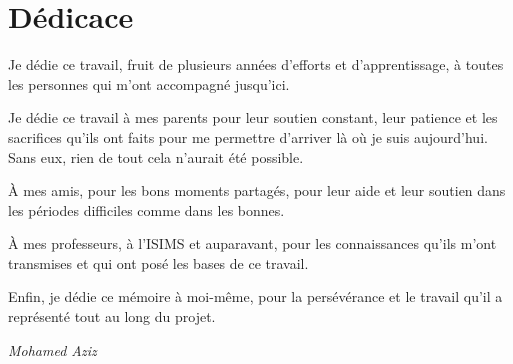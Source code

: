 \thispagestyle{empty}
\chapter*{Dédicace}

\vspace{2cm}

\begin{center}
\begin{minipage}{0.8\textwidth}
\setlength{\parskip}{10pt}

Je dédie ce travail, fruit de plusieurs années d'efforts et d'apprentissage, à toutes les personnes
qui m'ont accompagné jusqu'ici.

Je dédie ce travail à mes parents pour leur soutien constant, leur patience et les sacrifices
qu'ils ont faits pour me permettre d'arriver là où je suis aujourd'hui. Sans eux, rien de tout cela
n'aurait été possible.

À mes amis, pour les bons moments partagés, pour leur aide et leur soutien dans les périodes
difficiles comme dans les bonnes.

À mes professeurs, à l'ISIMS et auparavant, pour les connaissances qu'ils m'ont transmises et qui
ont posé les bases de ce travail.

Enfin, je dédie ce mémoire à moi-même, pour la persévérance et le travail qu'il a représenté tout
au long du projet.

\vspace{1cm}
\hfill \textit{Mohamed Aziz}
\end{minipage}
\end{center}

\clearpage
